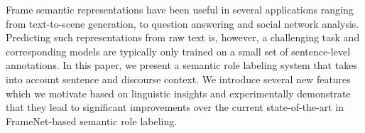 Frame semantic representations have been useful in several applications ranging from text-to-scene generation, to question answering and social network analysis. Predicting such representations from raw text is, however, a challenging task and corresponding models are typically only trained on a small set of sentence-level annotations. In this paper, we present a semantic role labeling system that takes into account sentence and discourse context. We introduce several new features which we motivate based on linguistic insights and experimentally demonstrate that they lead to significant improvements over the current state-of-the-art in FrameNet-based semantic role labeling.
